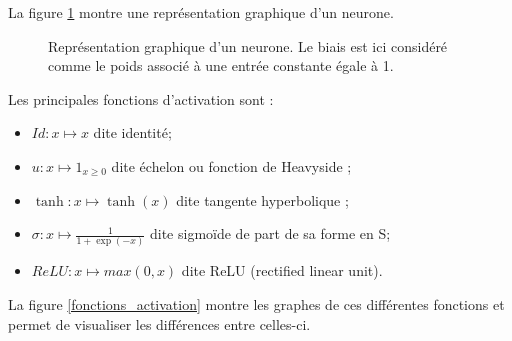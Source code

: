 La figure \ref{neurone} montre une représentation graphique d'un neurone.

\begin{figure}[H]
\begin{center}

\caption{Représentation graphique d'un neurone. Le biais est ici considéré comme le poids associé à une entrée constante égale à 1.}
\label{neurone}
\end{center}
\end{figure}

Les principales fonctions d'activation sont : 

\begin{itemize}
\item $Id : x \mapsto x$ dite identité;
\item $u : x \mapsto 1_{x \geq 0}$ dite échelon ou fonction de Heavyside ;
\item $\tanh : x \mapsto \tanh(x)$ dite tangente hyperbolique ;
\item $\sigma : x \mapsto \frac{1}{1+\exp(-x)}$ dite sigmoïde de part de sa forme en S;
\item $ReLU : x \mapsto max(0, x)$ dite ReLU (rectified linear unit).
\end{itemize}

La figure \ref{fonctions_activation} montre les graphes de ces différentes fonctions et permet de visualiser les différences entre celles-ci.

